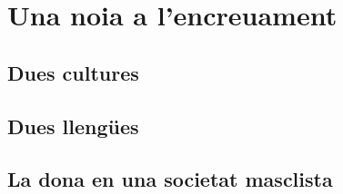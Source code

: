 \section{Una noia a l'encreuament}

\subsection{Dues cultures}

\subsection{Dues llengües}

\subsection{La dona en una societat masclista}
